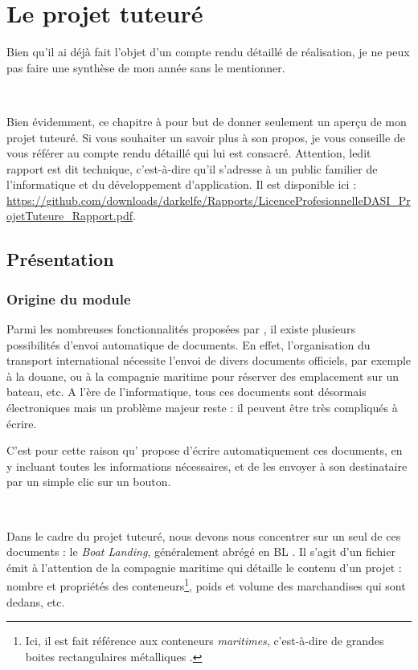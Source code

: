 \chapter{Le projet tuteuré}
Bien qu'il ai déjà fait l'objet d'un compte rendu détaillé de réalisation, je ne peux pas faire une synthèse de mon année sans le mentionner.

~

Bien évidemment, ce chapitre à pour but de donner seulement un aperçu de mon projet tuteuré. Si vous souhaiter un savoir plus à son propos, je vous conseille de vous référer au compte rendu détaillé qui lui est consacré. Attention, ledit rapport est dit technique, c'est-à-dire qu'il s'adresse à un public familier de l'informatique et du développement d'application. Il est disponible ici : \url{https://github.com/downloads/darkelfe/Rapports/LicenceProfesionnelleDASI_ProjetTuteure_Rapport.pdf}.

\section{Présentation}
\subsection{Origine du module}
Parmi les nombreuses fonctionnalités proposées par \integrale, il existe plusieurs possibilités d'envoi automatique de documents. En effet, l'organisation du transport international nécessite l'envoi de divers documents officiels, par exemple à la douane, ou à la compagnie maritime pour réserver des emplacement sur un bateau, etc. A l'ère de l'informatique, tous ces documents sont désormais électroniques mais un problème majeur reste : il peuvent être très compliqués à écrire.

C'est pour cette raison qu'\integrale{} propose d'écrire automatiquement ces documents, en y incluant toutes les informations nécessaires, et de les envoyer à son destinataire par un simple clic sur un bouton.

~

Dans le cadre du projet tuteuré, nous devons nous concentrer sur un seul de ces documents : le \emph{Boat Landing}, généralement abrégé en
\og BL \fg. Il s'agit d'un fichier émit à l'attention de la compagnie maritime qui détaille le contenu d'un projet : nombre et propriétés des conteneurs\footnote{Ici, il est fait référence aux conteneurs \emph{maritimes}, c'est-à-dire de \og grandes boites rectangulaires métalliques \fg.}, poids et volume des marchandises qui sont dedans, etc.

